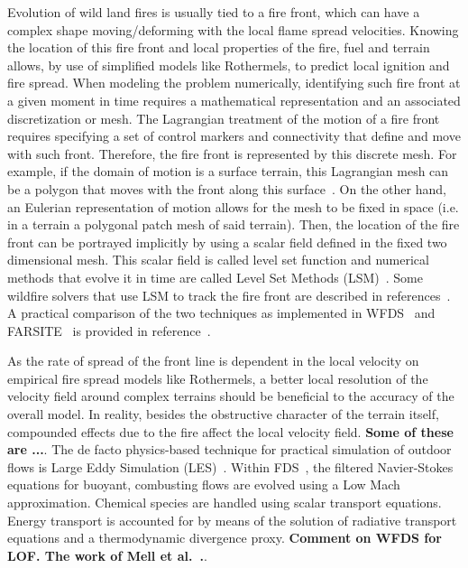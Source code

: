 \documentclass[journal,article,atmosphere,submit,moreauthors,pdftex]{Definitions/mdpi}
\begin{document}
Evolution of wild land fires is usually tied to a fire front, which can have a complex shape moving/deforming with the local flame spread velocities. Knowing the location of this fire front and local properties of the fire, fuel and terrain allows, by use of simplified models like Rothermels, to predict local ignition and fire spread. When modeling the problem numerically, identifying such fire front at a given moment in time requires a mathematical representation and an associated discretization or mesh. The Lagrangian treatment of the motion of a fire front requires specifying a set of control markers and connectivity that define and move with such front. Therefore, the fire front is represented by this discrete mesh. For example, if the domain of motion is a surface terrain, this Lagrangian mesh can be a polygon that moves with the front along this surface~\cite{Finney:FARSITE,Bova:IJWF2015}. 
On the other hand, an Eulerian representation of motion allows for the mesh to be fixed in space (i.e. in a terrain a polygonal patch mesh of said terrain). Then, the location of the fire front can be portrayed implicitly by using a scalar field defined in the fixed two dimensional mesh. This scalar field is called level set function and numerical methods that evolve it in time are called Level Set Methods (LSM)~\cite{Sethian:1999,Osher:2006}. Some wildfire solvers that use LSM to track the fire front are described in references~\cite{coen_2013,Bova:IJWF2015,mcgratta_2013,LAUTENBERGER_2013}. A practical comparison of the two techniques as implemented in WFDS~\cite{Mell:IJWF2007} and FARSITE~\cite{Finney:FARSITE} is provided in reference~\cite{Bova:IJWF2015}.

As the rate of spread of the front line is dependent in the local velocity on empirical fire spread models like Rothermels, a better local resolution of the velocity field around complex terrains should be beneficial to the accuracy of the overall model. In reality, besides the obstructive character of the terrain itself, compounded effects due to the fire affect the local velocity field. \textbf{Some of these are ...}.
The de facto physics-based technique for practical simulation of outdoor flows is Large Eddy Simulation (LES)~\cite{coen_2013,mcgratta_2013}. Within FDS~\cite{mcgratta_2013},  the filtered Navier-Stokes equations for buoyant, combusting flows are evolved using a Low Mach approximation. Chemical species are handled using scalar transport equations. Energy transport is accounted for by means of the solution of radiative transport equations and a thermodynamic divergence proxy. \textbf{Comment on WFDS for LOF. The work of Mell et al.~\cite{Mell:IJWF2007}.}.
\end{document}
